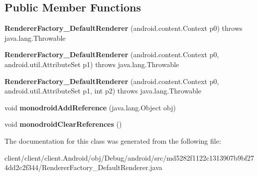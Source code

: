 \subsection*{Public Member Functions}
\begin{DoxyCompactItemize}
\item 
\hypertarget{classmd5282f1122c1313907b9bf274dd2c2f344_1_1RendererFactory__DefaultRenderer_a3c7eba66aa93a51f85b2b2fc700f7a05}{}{\bfseries Renderer\+Factory\+\_\+\+Default\+Renderer} (android.\+content.\+Context p0)  throws java.\+lang.\+Throwable 	\label{classmd5282f1122c1313907b9bf274dd2c2f344_1_1RendererFactory__DefaultRenderer_a3c7eba66aa93a51f85b2b2fc700f7a05}

\item 
\hypertarget{classmd5282f1122c1313907b9bf274dd2c2f344_1_1RendererFactory__DefaultRenderer_a79407a02996883a9df40b986929c16a8}{}{\bfseries Renderer\+Factory\+\_\+\+Default\+Renderer} (android.\+content.\+Context p0, android.\+util.\+Attribute\+Set p1)  throws java.\+lang.\+Throwable 	\label{classmd5282f1122c1313907b9bf274dd2c2f344_1_1RendererFactory__DefaultRenderer_a79407a02996883a9df40b986929c16a8}

\item 
\hypertarget{classmd5282f1122c1313907b9bf274dd2c2f344_1_1RendererFactory__DefaultRenderer_a7c957e1984eb2507cc85e9dc49da5b57}{}{\bfseries Renderer\+Factory\+\_\+\+Default\+Renderer} (android.\+content.\+Context p0, android.\+util.\+Attribute\+Set p1, int p2)  throws java.\+lang.\+Throwable 	\label{classmd5282f1122c1313907b9bf274dd2c2f344_1_1RendererFactory__DefaultRenderer_a7c957e1984eb2507cc85e9dc49da5b57}

\item 
\hypertarget{classmd5282f1122c1313907b9bf274dd2c2f344_1_1RendererFactory__DefaultRenderer_a201cdc0829442d18c2335e9c1cb6d998}{}void {\bfseries monodroid\+Add\+Reference} (java.\+lang.\+Object obj)\label{classmd5282f1122c1313907b9bf274dd2c2f344_1_1RendererFactory__DefaultRenderer_a201cdc0829442d18c2335e9c1cb6d998}

\item 
\hypertarget{classmd5282f1122c1313907b9bf274dd2c2f344_1_1RendererFactory__DefaultRenderer_a8a36ec920e4ca45a71da44caa2f7aa67}{}void {\bfseries monodroid\+Clear\+References} ()\label{classmd5282f1122c1313907b9bf274dd2c2f344_1_1RendererFactory__DefaultRenderer_a8a36ec920e4ca45a71da44caa2f7aa67}

\end{DoxyCompactItemize}


The documentation for this class was generated from the following file\+:\begin{DoxyCompactItemize}
\item 
client/client/client.\+Android/obj/\+Debug/android/src/md5282f1122c1313907b9bf274dd2c2f344/Renderer\+Factory\+\_\+\+Default\+Renderer.\+java\end{DoxyCompactItemize}
